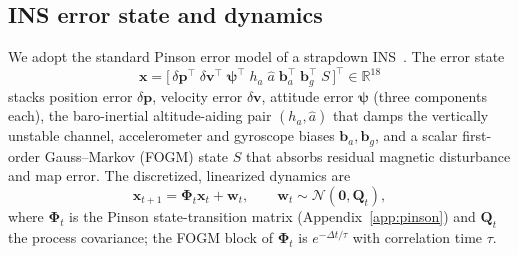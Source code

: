 \documentclass{IEEEtaes}
\begin{document}
\subsection{INS error state and dynamics}
We adopt the standard Pinson error model of a strapdown INS~\cite{groves2013,titterton2004,farrell2008}.
The error state
\begin{equation}
\mathbf{x}=\big[\,\delta\mathbf{p}^{\top}\;\delta\mathbf{v}^{\top}\;
\boldsymbol{\psi}^{\top}\;h_a\;\hat{a}\;\mathbf{b}_a^{\top}\;\mathbf{b}_g^{\top}\;S\,\big]^{\top}
\in\mathbb{R}^{18}
\label{eq:state}
\end{equation}
stacks position error $\delta\mathbf{p}$, velocity error $\delta\mathbf{v}$,
attitude error $\boldsymbol{\psi}$ (three components each), the baro-inertial
altitude-aiding pair $(h_a,\hat{a})$ that damps the vertically unstable channel,
accelerometer and gyroscope biases $\mathbf{b}_a,\mathbf{b}_g$, and a scalar
first-order Gauss--Markov (FOGM) state $S$ that absorbs residual magnetic
disturbance and map error. The discretized,
linearized dynamics are
\begin{equation}
\mathbf{x}_{t+1}=\boldsymbol{\Phi}_t\mathbf{x}_t+\mathbf{w}_t,\qquad
\mathbf{w}_t\sim\mathcal{N}(\mathbf{0},\mathbf{Q}_t),
\label{eq:dyn}
\end{equation}
where $\boldsymbol{\Phi}_t$ is the Pinson state-transition matrix
(Appendix~\ref{app:pinson}) and
$\mathbf{Q}_t$ the process covariance; the FOGM block of $\boldsymbol{\Phi}_t$ is
$e^{-\Delta t/\tau}$ with correlation time $\tau$.
\end{document}
